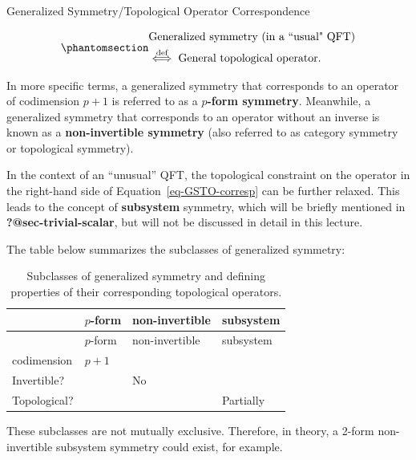 \documentclass[11pt,toc=bibliography]{scrbook}
\numberwithin{equation}{section}
\begin{document}
\begin{important}{Generalized Symmetry/Topological Operator Correspondence}

\begin{equation}\phantomsection\label{eq-GSTO-corresp}{\begin{split}
&\text{Generalized symmetry (in a ``usual" QFT)} \\ 
&\stackrel{\text{def}}{\Longleftrightarrow}\;
\text{General topological operator.}
\end{split}
}\end{equation}

\end{important}

In more specific terms, a generalized symmetry that corresponds to an
operator of codimension \(p+1\) is referred to as a \textbf{\(p\)-form
symmetry}. Meanwhile, a generalized symmetry that corresponds to an
operator without an inverse is known as a \textbf{non-invertible
symmetry} (also referred to as category symmetry or topological
symmetry).

In the context of an ``unusual'' QFT, the topological constraint on the
operator in the right-hand side of Equation~\ref{eq-GSTO-corresp} can be
further relaxed. This leads to the concept of \textbf{subsystem}
symmetry, which will be briefly mentioned in
\textbf{?@sec-trivial-scalar}, but will not be discussed in detail in
this lecture.

The table below summarizes the subclasses of generalized symmetry:

\begin{longtable}[]{@{}llll@{}}
\caption{Subclasses of generalized symmetry and defining properties of
their corresponding topological
operators.}\label{tbl-sym-classes}\tabularnewline
\toprule\noalign{}
& \(p\)-form & non-invertible & subsystem \\
\midrule\noalign{}
\endfirsthead
\toprule\noalign{}
& \(p\)-form & non-invertible & subsystem \\
\midrule\noalign{}
\endhead
\bottomrule\noalign{}
\endlastfoot
codimension & \(p+1\) & & \\
Invertible? & & No & \\
Topological? & & & Partially \\
\end{longtable}

These subclasses are not mutually exclusive. Therefore, in theory, a
2-form non-invertible subsystem symmetry could exist, for example.
\end{document}
